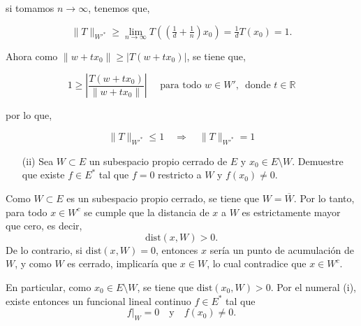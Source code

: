 si tomamos \(n \to \infty\), tenemos que,

$$
\|T\|_{W'^*} \geq \lim_{n \to \infty} T\left( \left( \tfrac{1}{d} + \tfrac{1}{n} \right)x_0 \right) = \tfrac{1}{d} T(x_0) = 1.
$$

Ahora como \(\|w + t x_0\| \geq |T(w+ t x_0)|\), se tiene que,

$$
1 \geq \left| \frac{T(w + t x_0)}{\|w + t x_0\|} \right| \quad \text{ para todo } w \in W',\, \text{ donde } t \in \mathbb{R}
$$

por lo que, 

$$
\|T\|_{W'^*} \leq 1 \quad \Rightarrow \quad \|T\|_{W'^*} = 1
$$




\begin{itemize}
    \item[(ii)] Sea $W\subset E$ un subespacio propio cerrado de $E$ y $x_0\in E\setminus W.$ Demuestre que existe $f\in E^*$ tal que $f=0$ restricto a $W$ y $f(x_0)\neq 0$. 
\end{itemize}


Como $W \subset E$ es un subespacio propio cerrado, se tiene que $W = \overline{W}$. Por lo tanto, para todo $x \in W^c$ se cumple que la distancia de $x$ a $W$ es estrictamente mayor que cero, es decir,
\[
\mathrm{dist}(x, W) > 0.
\]
De lo contrario, si $\mathrm{dist}(x, W) = 0$, entonces $x$ sería un punto de acumulación de $W$, y como $W$ es cerrado, implicaría que $x \in W$, lo cual contradice que $x \in W^c$.

En particular, como $x_0 \in E \setminus W$, se tiene que $\mathrm{dist}(x_0, W) > 0$. Por el numeral (i), existe entonces un funcional lineal continuo $f \in E^*$ tal que
\[
f|_W = 0 \quad \text{y} \quad f(x_0) \neq 0.
\]
